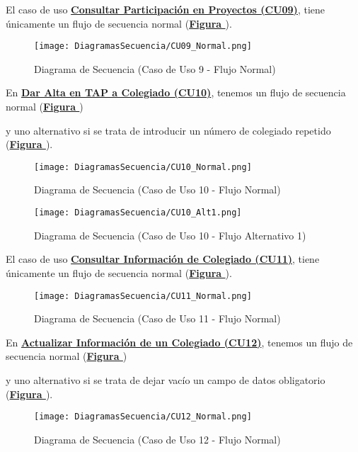 \addtocounter{figura}{1}
El caso de uso \textbf{\hyperref[tab:cucConsultaProyectos]{Consultar Participación en Proyectos (CU09)}}, tiene únicamente un flujo de secuencia normal (\textbf{\hyperref[fig:Secuencia_CU9_Normal]{Figura }}).
\begin{figure}[!htbp]
  \centering
  \texttt{[image: DiagramasSecuencia/CU09\_Normal.png]}
  \caption{Diagrama de Secuencia (Caso de Uso 9 - Flujo Normal)}
  \label{fig:Secuencia_CU9_Normal}
\end{figure}
\FloatBarrier

\addtocounter{figura}{1} \pagebreak
En \textbf{\hyperref[tab:curColegAlta]{Dar Alta en TAP a Colegiado (CU10)}}, tenemos un flujo de secuencia normal (\textbf{\hyperref[fig:Secuencia_CU10_Normal]{Figura }}) \addtocounter{figura}{1} y uno alternativo si se trata de introducir un número de colegiado repetido (\textbf{\hyperref[fig:Secuencia_CU10_Alt1]{Figura }}).
\begin{figure}[!htbp]
  \centering
  \texttt{[image: DiagramasSecuencia/CU10\_Normal.png]}
  \caption{Diagrama de Secuencia (Caso de Uso 10 - Flujo Normal)}
  \label{fig:Secuencia_CU10_Normal}
\end{figure}
\FloatBarrier

\begin{figure}[!htbp]
  \centering
  \texttt{[image: DiagramasSecuencia/CU10\_Alt1.png]}
  \caption{Diagrama de Secuencia (Caso de Uso 10 - Flujo Alternativo 1)}
  \label{fig:Secuencia_CU10_Alt1}
\end{figure}
\FloatBarrier

\addtocounter{figura}{1} \pagebreak
El caso de uso \textbf{\hyperref[tab:curConsultaInfoColeg]{Consultar Información de Colegiado (CU11)}}, tiene únicamente un flujo de secuencia normal (\textbf{\hyperref[fig:Secuencia_CU11_Normal]{Figura }}).
\begin{figure}[!htbp]
  \centering
  \texttt{[image: DiagramasSecuencia/CU11\_Normal.png]}
  \caption{Diagrama de Secuencia (Caso de Uso 11 - Flujo Normal)}
  \label{fig:Secuencia_CU11_Normal}
\end{figure}
\FloatBarrier

\addtocounter{figura}{1}
En \textbf{\hyperref[tab:curActualizarColeg]{Actualizar Información de un Colegiado (CU12)}}, tenemos un flujo de secuencia normal (\textbf{\hyperref[fig:Secuencia_CU12_Normal]{Figura }}) \addtocounter{figura}{1} y uno alternativo si se trata de dejar vacío un campo de datos obligatorio (\textbf{\hyperref[fig:Secuencia_CU12_Alt1]{Figura }}).
\begin{figure}[!htbp]
  \centering
  \texttt{[image: DiagramasSecuencia/CU12\_Normal.png]}
  \caption{Diagrama de Secuencia (Caso de Uso 12 - Flujo Normal)}
  \label{fig:Secuencia_CU12_Normal}
\end{figure}
\FloatBarrier

